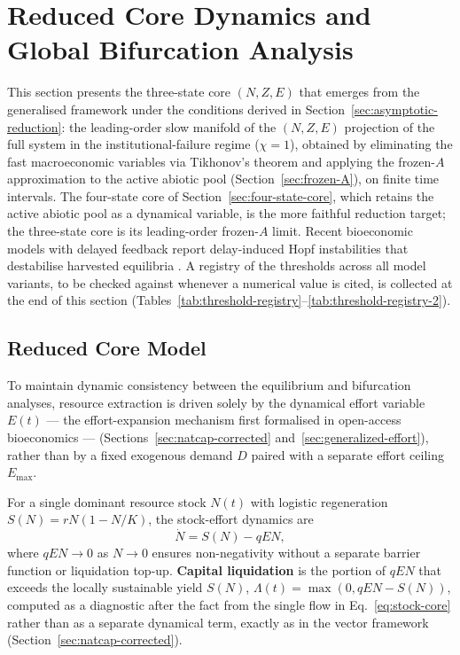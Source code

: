 \documentclass[twocolumn,10pt]{article}
\begin{document}
\section{Reduced Core Dynamics and Global Bifurcation Analysis}
\label{sec:core-model}
This section presents the three-state core \((N,Z,E)\) that emerges from the generalised framework under the conditions derived in Section~\ref{sec:asymptotic-reduction}: the leading-order slow manifold of the \((N,Z,E)\) projection of the full system in the institutional-failure regime (\(\chi=1\)), obtained by eliminating the fast macroeconomic variables via Tikhonov's theorem and applying the frozen-\(A\) approximation to the active abiotic pool (Section~\ref{sec:frozen-A}), on finite time intervals. The four-state core of Section~\ref{sec:four-state-core}, which retains the active abiotic pool as a dynamical variable, is the more faithful reduction target; the three-state core is its leading-order frozen-\(A\) limit. Recent bioeconomic models with delayed feedback report delay-induced Hopf instabilities that destabilise harvested equilibria \cite{gao2022,khiyar2026}. A registry of the thresholds across all model variants, to be checked against whenever a numerical value is cited, is collected at the end of this section (Tables~\ref{tab:threshold-registry}--\ref{tab:threshold-registry-2}).

\subsection{Reduced Core Model}
\label{sec:core-model-eqs}
To maintain dynamic consistency between the equilibrium and bifurcation analyses, resource extraction is driven solely by the dynamical effort variable $E(t)$ --- the effort-expansion mechanism first formalised in open-access bioeconomics \cite{gordon1954} --- (Sections~\ref{sec:natcap-corrected} and~\ref{sec:generalized-effort}), rather than by a fixed exogenous demand $D$ paired with a separate effort ceiling $E_{\max}$.

For a single dominant resource stock \(N(t)\) with logistic regeneration \(S(N) = rN(1-N/K)\), the stock-effort dynamics are
\begin{equation}
\dot{N} = S(N) - qEN,
\label{eq:stock-core}
\end{equation}
where $qEN\to0$ as $N\to0$ ensures non-negativity without a separate barrier function or liquidation top-up. \textbf{Capital liquidation} is the portion of $qEN$ that exceeds the locally sustainable yield $S(N)$, $\Lambda(t)=\max(0,qEN-S(N))$, computed as a diagnostic after the fact from the single flow in Eq.~\eqref{eq:stock-core} rather than as a separate dynamical term, exactly as in the vector framework (Section~\ref{sec:natcap-corrected}).
\end{document}
